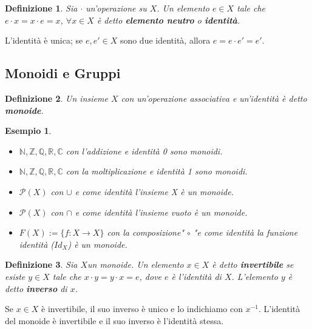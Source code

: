 \documentclass[a4paper,12pt]{article}
\theoremstyle{def}
\newtheorem*{definition}{Definizione}
\theoremstyle{prop}
\theoremstyle{esempio}
\newtheorem*{example}{Esempio}
\theoremstyle{dimostrazione}
\theoremstyle{teo}
\theoremstyle{osservazione}
\begin{document}
\begin{definition}
	Sia \(\cdot\) un'operazione su \(X\). Un elemento \(e \in X\) tale che \(e \cdot x = x \cdot e = x\), \(\forall x \in X\) è detto \textbf{elemento neutro }o \textbf{identità}.
\end{definition}

L'identità è unica; se \(e,e' \in X\) sono due identità, allora \(e = e \cdot e' = e'\).

\subsection{Monoidi e Gruppi}

\begin{definition}
	Un insieme \(X\) con un'operazione associativa e un'identità è detto \newline \textbf{monoide}.
\end{definition}

\begin{example}
	\
	\begin{itemize}
		\item \(\mathbb{N,Z,Q,R,C}\) con l'addizione e identità 0 sono monoidi.
		\item \(\mathbb{N,Z,Q,R,C}\) con la moltiplicazione e identità 1 sono monoidi.
		\item \(\mathcal{P} (X)\) con \(\cup\)  e come identità l'insieme X è un monoide.
		\item \(\mathcal{P} (X)\) con \(\cap\)  e come identità l'insieme vuoto è un monoide.
		\item \(F(X):= \{f: X \rightarrow X\}\) con la composizione" \(\circ\) "e come identità
		      la funzione identità (\(Id_X\)) è un monoide.
	\end{itemize}
\end{example}

\begin{definition}
	Sia \(X \)un monoide. Un elemento \(x \in X\) è detto \textbf{invertibile} se esiste \(y \in X\) tale che
	\(x \cdot y = y \cdot x = e\), dove \(e\) è l'identità di \(X\). L'elemento \(y\) è detto \textbf{inverso} di \(x\).
\end{definition}

Se \(x \in X\) è invertibile, il suo inverso è unico e lo indichiamo con \(x^{-1}\).\newline
L'identità del monoide è invertibile e il suo inverso è l'identità stessa.
\end{document}
